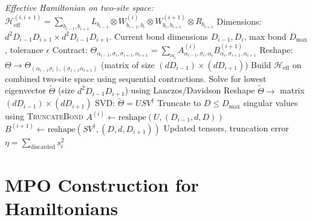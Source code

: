 \documentclass[aps,prb,onecolumn,scriptaddress]{revtex4-2}
\newcommand{\eps}{\epsilon}
\begin{document}
	\begin{algorithm}[H]
		\caption{TwoSiteUpdate}
		\begin{algorithmic}[1]
			\Statex \textit{Effective Hamiltonian on two-site space:}
			\Statex $\mathcal{H}_{\text{eff}}^{(i,i+1)} = \sum_{b_{i-1}, b_{i+1}} L_{b_{i-1}} \otimes W^{(i)}_{b_{i-1},b_i} \otimes W^{(i+1)}_{b_i,b_{i+1}} \otimes R_{b_{i+1}}$
			\Statex Dimensions: $d^2 D_{i-1} D_{i+1} \times d^2 D_{i-1} D_{i+1}$.
			\Require Current bond dimensions $D_{i-1}, D_i$, max bond $D_{\max}$, tolerance $\eps$					
			\State Contract: $\Theta_{\alpha_{i-1},\sigma_i,\sigma_{i+1},\alpha_{i+1}} = \sum_{\alpha_i} A^{(i)}_{\alpha_{i-1},\sigma_i,\alpha_i} B^{(i+1)}_{\alpha_i,\sigma_{i+1},\alpha_{i+1}}$
			\State Reshape: $\Theta \to \Theta_{(\alpha_{i-1}\sigma_i), (\sigma_{i+1}\alpha_{i+1})}$ (matrix of size $(d D_{i-1}) \times (d D_{i+1})$)
			\State Build $\mathcal{H}_{\text{eff}}$ on combined two-site space using sequential contractions.
			\State Solve for lowest eigenvector $\tilde{\Theta}$ (size $d^2 D_{i-1} D_{i+1}$) using Lanczos/Davidson
			\State Reshape $\tilde{\Theta} \to$ matrix $(d D_{i-1}) \times (d D_{i+1})$
			\State SVD: $\tilde{\Theta} = U S V^\dagger$
			\State Truncate to $D \leq D_{\max}$ singular values using \textsc{TruncateBond}
			\State $A^{(i)} \gets \text{reshape}(U, (D_{i-1}, d, D))$ 
			\State $B^{(i+1)} \gets \text{reshape}(S V^\dagger, (D, d, D_{i+1}))$ 
			\State \Return Updated tensors, truncation error $\eta = \sum_{\text{discarded}} s_i^2$
		\end{algorithmic}
	\end{algorithm}
	
	\section{MPO Construction for Hamiltonians}
	
\end{document}
